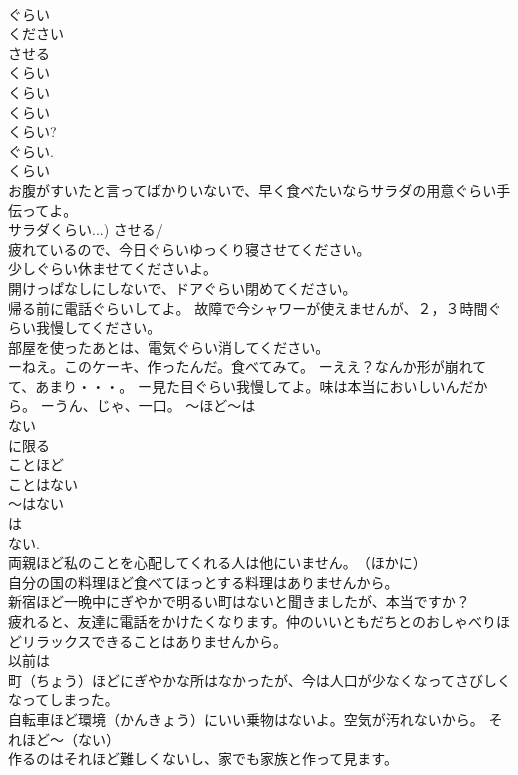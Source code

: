 \documentclass[8pt]{extreport}
\begin{document}
\begin{CJK}{UTF8}{min}
\\	ぐらい
\\	ください 
\\	させる 
\\	くらい
\\	くらい
\\	くらい
\\	くらい? 
\\	ぐらい. 
\\	くらい
\\	お腹がすいたと言ってばかりいないで、早く食べたいならサラダの用意ぐらい手伝ってよ。 
\\	サラダくらい...) させる/
\\	疲れているので、今日ぐらいゆっくり寝させてください。 
\\	少しぐらい休ませてくださいよ。 
\\	開けっぱなしにしないで、ドアぐらい閉めてください。 
\\	帰る前に電話ぐらいしてよ。 故障で今シャワーが使えませんが、２，３時間ぐらい我慢してください。 
\\	部屋を使ったあとは、電気ぐらい消してください。 
\\	ーねえ。このケーキ、作ったんだ。食べてみて。 ーええ？なんか形が崩れてて、あまり・・・。 ー見た目ぐらい我慢してよ。味は本当においしいんだから。 ーうん、じゃ、一口。 ～ほど～は
\\	ない 
\\	に限る 
\\	ことほど
\\	ことはない 
\\	～はない 
\\	は 
\\	ない. 
\\	両親ほど私のことを心配してくれる人は他にいません。　（ほかに） 
\\	自分の国の料理ほど食べてほっとする料理はありませんから。 
\\	新宿ほど一晩中にぎやかで明るい町はないと聞きましたが、本当ですか？ 
\\	疲れると、友達に電話をかけたくなります。仲のいいともだちとのおしゃべりほどリラックスできることはありませんから。 
\\	以前は
\\	町（ちょう）ほどにぎやかな所はなかったが、今は人口が少なくなってさびしくなってしまった。 
\\	自転車ほど環境（かんきょう）にいい乗物はないよ。空気が汚れないから。 それほど～（ない） 
\\	作るのはそれほど難しくないし、家でも家族と作って見ます。 

\end{CJK}
\end{document}
